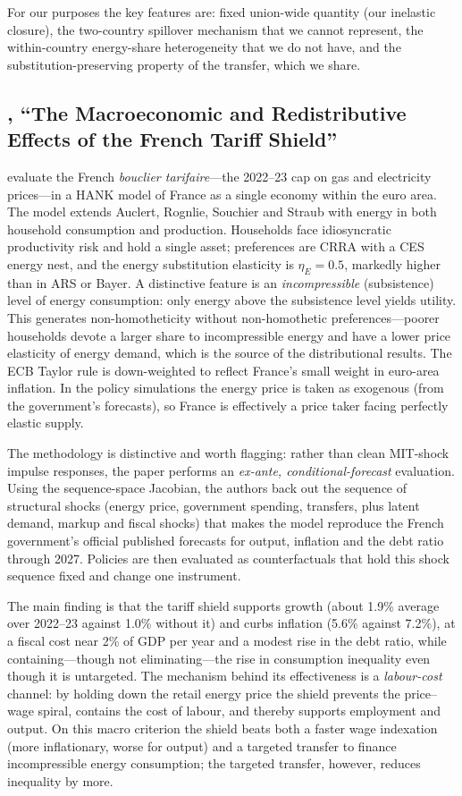 \documentclass[11pt,a4paper]{article}
\begin{document}
For our purposes the key features are: fixed union-wide quantity (our inelastic
closure), the two-country spillover mechanism that we cannot represent, the
within-country energy-share heterogeneity that we do not have, and the
substitution-preserving property of the transfer, which we share.

\subsection{\citet{Langot2026}, ``The Macroeconomic and Redistributive Effects
of the French Tariff Shield''}

\citet{Langot2026} evaluate the French \emph{bouclier tarifaire}---the 2022--23
cap on gas and electricity prices---in a HANK model of France as a single
economy within the euro area. The model extends Auclert, Rognlie, Souchier and
Straub with energy in both household consumption and production. Households face
idiosyncratic productivity risk and hold a single asset; preferences are CRRA
with a CES energy nest, and the energy substitution elasticity is $\eta_E=0.5$,
markedly higher than in ARS or Bayer. A distinctive feature is an
\emph{incompressible} (subsistence) level of energy consumption: only energy
above the subsistence level yields utility. This generates non-homotheticity
without non-homothetic preferences---poorer households devote a larger share to
incompressible energy and have a lower price elasticity of energy demand, which
is the source of the distributional results. The ECB Taylor rule is
down-weighted to reflect France's small weight in euro-area inflation. In the
policy simulations the energy price is taken as exogenous (from the
government's forecasts), so France is effectively a price taker facing
perfectly elastic supply.

The methodology is distinctive and worth flagging: rather than clean MIT-shock
impulse responses, the paper performs an \emph{ex-ante, conditional-forecast}
evaluation. Using the sequence-space Jacobian, the authors back out the
sequence of structural shocks (energy price, government spending, transfers,
plus latent demand, markup and fiscal shocks) that makes the model reproduce
the French government's official published forecasts for output, inflation and
the debt ratio through 2027. Policies are then evaluated as counterfactuals
that hold this shock sequence fixed and change one instrument.

The main finding is that the tariff shield supports growth (about 1.9\% average
over 2022--23 against 1.0\% without it) and curbs inflation (5.6\% against
7.2\%), at a fiscal cost near 2\% of GDP per year and a modest rise in the debt
ratio, while containing---though not eliminating---the rise in consumption
inequality even though it is untargeted. The mechanism behind its effectiveness
is a \emph{labour-cost} channel: by holding down the retail energy price the
shield prevents the price--wage spiral, contains the cost of labour, and
thereby supports employment and output. On this macro criterion the shield
beats both a faster wage indexation (more inflationary, worse for output) and a
targeted transfer to finance incompressible energy consumption; the targeted
transfer, however, reduces inequality by more.
\end{document}
